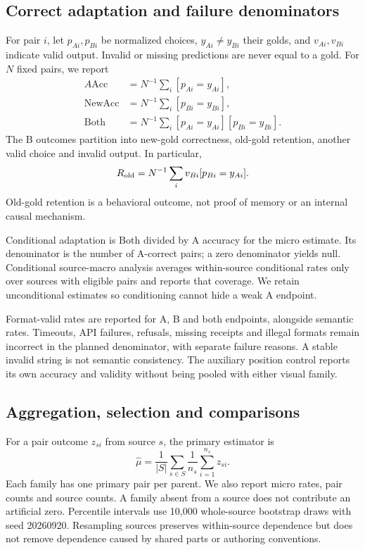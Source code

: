 \documentclass[10pt,twocolumn,letterpaper]{article}
\begin{document}
\subsection{Correct adaptation and failure denominators}
For pair $i$, let $p_{Ai},p_{Bi}$ be normalized choices, $y_{Ai}\ne
y_{Bi}$ their golds, and $v_{Ai},v_{Bi}$ indicate valid output.
Invalid or missing predictions are never equal to a gold. For
$N$ fixed pairs, we report
\begin{align}
A\mathrm{Acc}&=N^{-1}\sum_i[p_{Ai}=y_{Ai}],\\
\mathrm{NewAcc}&=N^{-1}\sum_i[p_{Bi}=y_{Bi}],\\
\mathrm{Both}&=N^{-1}\sum_i[p_{Ai}=y_{Ai}][p_{Bi}=y_{Bi}].
\end{align}
The B outcomes partition into new-gold correctness, old-gold retention,
another valid choice and invalid output. In particular,
\begin{equation}
R_{\rm old}=N^{-1}\sum_i v_{Bi}[p_{Bi}=y_{Ai}].
\end{equation}
Old-gold retention is a behavioral outcome, not proof of memory or an
internal causal mechanism.

Conditional adaptation is Both divided by A accuracy for the micro
estimate. Its denominator is the number of A-correct pairs; a zero
denominator yields null. Conditional source-macro analysis averages
within-source conditional rates only over sources with eligible pairs
and reports that coverage. We retain unconditional estimates so
conditioning cannot hide a weak A endpoint.

Format-valid rates are reported for A, B and both endpoints, alongside
semantic rates. Timeouts, API failures, refusals, missing receipts and
illegal formats remain incorrect in the planned denominator, with
separate failure reasons. A stable invalid string is not semantic
consistency. The auxiliary position control reports its own accuracy
and validity without being pooled with either visual family.

\subsection{Aggregation, selection and comparisons}
For a pair outcome $z_{si}$ from source $s$, the primary estimator is
\begin{equation}
\widehat\mu=\frac{1}{|S|}\sum_{s\in S}
                 \frac{1}{n_s}\sum_{i=1}^{n_s}z_{si}.
\end{equation}
Each family has one primary pair per parent. We also report micro
rates, pair counts and source counts. A family absent from a source
does not contribute an artificial zero. Percentile intervals use
10,000 whole-source bootstrap draws with seed 20260920. Resampling
sources preserves within-source dependence but does not remove
dependence caused by shared parts or authoring conventions.
\end{document}
